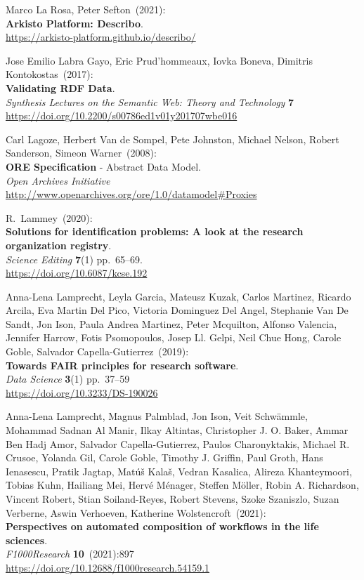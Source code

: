 \begin{thebibliography}{9}
Marco La Rosa, Peter Sefton~(2021): \\
\textbf{Arkisto Platform: Describo}.\\
\url{https://arkisto-platform.github.io/describo/}

Jose Emilio Labra Gayo, Eric Prud'hommeaux, Iovka Boneva, Dimitris
Kontokostas~(2017): \\
\textbf{Validating {RDF Data}}. \\
\emph{Synthesis Lectures on the Semantic Web: Theory and Technology} \textbf{7} \\
\url{https://doi.org/10.2200/s00786ed1v01y201707wbe016}

Carl Lagoze, 
Herbert Van de Sompel, 
Pete Johnston, 
Michael Nelson, 
Robert Sanderson, 
Simeon Warner~(2008): \\
\textbf{ORE Specification} - {Abstract Data Model}. \\
\emph{Open Archives Initiative}\\
\url{http://www.openarchives.org/ore/1.0/datamodel#Proxies} 

R.~Lammey~(2020): \\
\textbf{Solutions for identification problems: A look at the research
organization registry}.\\
\emph{Science Editing} \textbf{7}(1) pp.~65--69.\\
\url{https://doi.org/10.6087/kcse.192}

Anna-Lena Lamprecht, Leyla Garcia, Mateusz Kuzak, Carlos
Martinez, Ricardo Arcila, Eva Martin Del Pico, Victoria Dominguez Del
Angel, Stephanie Van De Sandt, Jon Ison, Paula Andrea Martinez, Peter
Mcquilton, Alfonso Valencia, Jennifer Harrow, Fotis Psomopoulos, Josep
Ll. Gelpi, Neil Chue Hong, Carole Goble, Salvador Capella-Gutierrez~(2019): \\
\textbf{Towards FAIR principles for research software}.\\
\emph{Data Science} \textbf{3}(1) pp.~37--59\\
\url{https://doi.org/10.3233/DS-190026}

Anna-Lena Lamprecht, Magnus Palmblad, Jon Ison, Veit Schwämmle, Mohammad
Sadnan Al Manir, Ilkay Altintas, Christopher J. O. Baker, Ammar Ben Hadj
Amor, Salvador Capella-Gutierrez, Paulos Charonyktakis, Michael R.
Crusoe, Yolanda Gil, Carole Goble, Timothy J. Griffin, Paul Groth, Hans
Ienasescu, Pratik Jagtap, Matúš Kalaš, Vedran Kasalica, Alireza
Khanteymoori, Tobias Kuhn, Hailiang Mei, Hervé Ménager, Steffen Möller,
Robin A. Richardson, Vincent Robert, Stian Soiland-Reyes, Robert
Stevens, Szoke Szaniszlo, Suzan Verberne, Aswin Verhoeven, Katherine
Wolstencroft~(2021): \\
\textbf{Perspectives on automated composition of workflows
in the life sciences}. \\
\emph{F1000Research} \textbf{10}~(2021):897 \\
\url{https://doi.org/10.12688/f1000research.54159.1}


\end{thebibliography}
